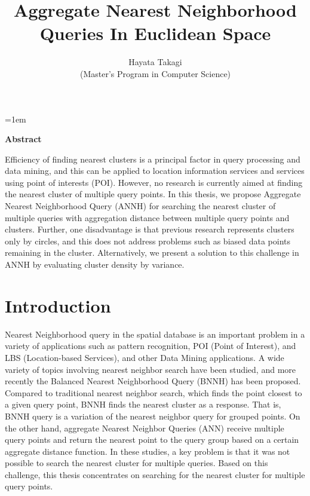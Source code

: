 \documentclass[a4paper,11pt]{report}
\title{Aggregate Nearest Neighborhood Queries In Euclidean Space}
\author{Hayata Takagi\\ (Master's Program in Computer Science)}
\theoremstyle{mytheoremstyle}
\begin{document}
\maketitle
\thispagestyle{empty}
\newpage

\thispagestyle{empty}
\vspace*{20pt plus 1fil}
\parindent=1em
\noindent

\begin{center}
    \textbf{Abstract}
\end{center}
\vspace{0.2in}

Efficiency of finding nearest clusters is a principal factor in query processing and data mining, and this can be applied to location information services and services using point of interests (POI). However, no research is currently aimed at finding the nearest cluster of multiple query points. In this thesis, we propose Aggregate Nearest Neighborhood Query (ANNH) for searching the nearest cluster of multiple queries with aggregation distance between multiple query points and clusters. Further, one disadvantage is that previous research represents clusters only by circles, and this does not address problems such as biased data points remaining in the cluster. Alternatively, we present a solution to this challenge in ANNH by evaluating cluster density by variance.

\par
\vspace{0pt plus 1fil}
\newpage

\tableofcontents
\listoffigures

\pagebreak \setcounter{page}{1}


\chapter{Introduction}
Nearest Neighborhood query in the spatial database is an important problem in a variety of applications such as pattern recognition, POI (Point of Interest), and LBS (Location-based Services), and other Data Mining applications\cite{adeniyi2016automated}. A wide variety of topics involving nearest neighbor search have been studied, and more recently the Balanced Nearest Neighborhood Query (BNNH)\cite{BNNH} has been proposed. Compared to traditional nearest neighbor search, which finds the point closest to a given query point, BNNH finds the nearest cluster as a response. That is, BNNH query is a variation of the nearest neighbor query for grouped points. On the other hand, aggregate Nearest Neighbor Queries (ANN)\cite{ANN} receive multiple query points and return the nearest point to the query group based on a certain aggregate distance function. In these studies, a key problem is that it was not possible to search the nearest cluster for multiple queries. Based on this challenge, this thesis concentrates on searching for the nearest cluster for multiple query points.
\end{document}
